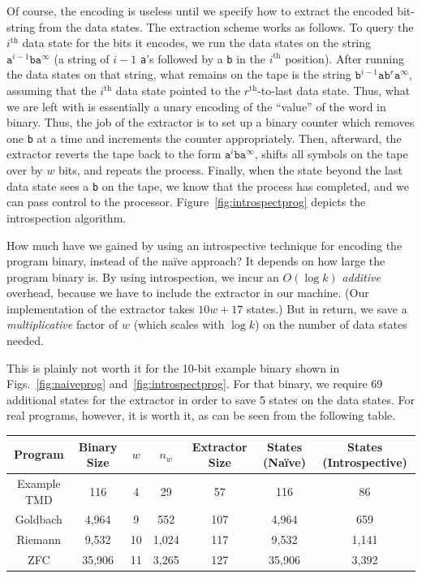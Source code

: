 \documentclass[11pt]{article}
\begin{document}
Of course, the encoding is useless until we specify how to extract the encoded bit-string from the data states. The extraction scheme works as follows. To query the $i^\textrm{th}$ data state for the bits it encodes, we run the data states on the string $\texttt{a}^{i-1}\texttt{b}\texttt{a}^{\infty}$ (a string of $i-1$ \texttt{a}'s followed by a \texttt{b} in the $i^\textrm{th}$ position). After running the data states on that string, what remains on the tape is the string $\texttt{b}^{i-1}\texttt{a}\texttt{b}^r\texttt{a}^{\infty}$, assuming that the $i^\textrm{th}$ data state pointed to the $r^\textrm{th}$-to-last data state. Thus, what we are left with is essentially a unary encoding of the ``value'' of the word in binary. Thus, the job of the extractor is to set up a binary counter which removes one \texttt{b} at a time and increments the counter appropriately. Then, afterward, the extractor reverts the tape back to the form $\texttt{a}^i\texttt{b}\texttt{a}^{\infty}$, shifts all symbols on the tape over by $w$ bits, and repeats the process. Finally, when the state beyond the last data state sees a \texttt{b} on the tape, we know that the process has completed, and we can pass control to the processor. Figure~\ref{fig:introspectprog} depicts the introspection algorithm.

How much have we gained by using an introspective technique for encoding the program binary, instead of the na\"ive approach? It depends on how large the program binary is. By using introspection, we incur an $O(\log k)$ \emph{additive} overhead, because we have to include the extractor in our machine. (Our implementation of the extractor takes $10w + 17$ states.) But in return, we save a \emph{multiplicative} factor of $w$ (which scales with $\log k$) on the number of data states needed. 

This is plainly not worth it for the 10-bit example binary shown in Figs.~\ref{fig:naiveprog} and~\ref{fig:introspectprog}. For that binary, we require 69 additional states for the extractor in order to save 5 states on the data states. For real programs, however, it is worth it, as can be seen from the following table.

\begin{center}
    \begin{tabular}{||c c c c c c c||}
    \hline
    Program & Binary Size & $w$ & $n_w$ & Extractor Size & States (Na\"ive) & States (Introspective) \\ [0.5ex]
    \hline\hline
    Example TMD & 116 & 4 & 29 & 57 & 116 & 86 \\
    \hline
    Goldbach & 4,964 & 9 & 552 & 107 & 4,964 & 659 \\
    \hline
    Riemann & 9,532 & 10 & 1,024 & 117 & 9,532 & 1,141 \\
    \hline 
    ZFC & 35,906 & 11 & 3,265 & 127 & 35,906 & 3,392 \\
    \hline
    \end{tabular}
\end{center}
\end{document}
